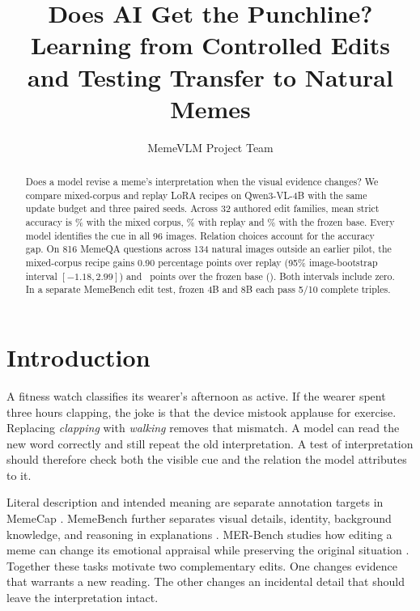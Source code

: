 \documentclass[11pt]{article}
\title{\textcolor{paperblue}{Does AI Get the Punchline?}\\
Learning from Controlled Edits and Testing Transfer to Natural Memes}
\author{MemeVLM Project Team}
\begin{document}
\raggedbottom
\maketitle
\begin{abstract}
Does a model revise a meme's interpretation when the visual evidence changes? We compare mixed-corpus and replay LoRA recipes on Qwen3-VL-4B with the same update budget and three paired seeds. Across 32 authored edit families, mean strict accuracy is \SyntheticBilingual\% with the mixed corpus, \SyntheticChinese\% with replay and \SyntheticBase\% with the frozen base. Every model identifies the cue in all 96 images. Relation choices account for the accuracy gap. On 816 MemeQA questions across 134 natural images outside an earlier pilot, the mixed-corpus recipe gains 0.90 percentage points over replay (95\% image-bootstrap interval $[-1.18,2.99]$) and \PrimaryContrast\ points over the frozen base (\PrimaryInterval). Both intervals include zero. In a separate MemeBench edit test, frozen 4B and 8B each pass 5/10 complete triples.
\end{abstract}

\section{Introduction}

A fitness watch classifies its wearer's afternoon as active. If the wearer spent three hours clapping, the joke is that the device mistook applause for exercise. Replacing \emph{clapping} with \emph{walking} removes that mismatch. A model can read the new word correctly and still repeat the old interpretation. A test of interpretation should therefore check both the visible cue and the relation the model attributes to it.

Literal description and intended meaning are separate annotation targets in MemeCap \citep{hwang2023memecap}. MemeBench further separates visual details, identity, background knowledge, and reasoning in explanations \citep{wang2026meme}. MER-Bench studies how editing a meme can change its emotional appraisal while preserving the original situation \citep{nie2026merbench}. Together these tasks motivate two complementary edits. One changes evidence that warrants a new reading. The other changes an incidental detail that should leave the interpretation intact.
\end{document}

